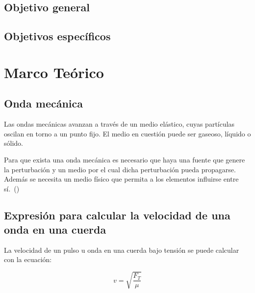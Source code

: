 \documentclass[twocolumn, 12pt]{article}
\begin{document}
\subsection{Objetivo general}


\subsection{Objetivos específicos}



\section{Marco Teórico}

\subsection{Onda mecánica}

Las ondas mecánicas avanzan a través de un medio elástico,
cuyas partículas oscilan en torno a un punto fijo. El medio
en cuestión puede ser gaseoso, líquido o sólido.

Para que exista una onda mecánica es necesario que haya una
fuente que genere la perturbación y un medio por el cual
dicha perturbación pueda propagarse. Además se necesita un
medio físico que permita a los elementos influirse entre
sí.~(\cite{J_Merino_2022})

\subsection{Expresión para calcular la velocidad de una onda en una cuerda}

La velocidad de un pulso u onda en una cuerda bajo tensión
se puede calcular con la ecuación:

\begin{equation}
    v = \sqrt{\frac{F_T}{\mu}}
    \label{eq:velocidad-onda-cuerda}
\end{equation}
\end{document}
